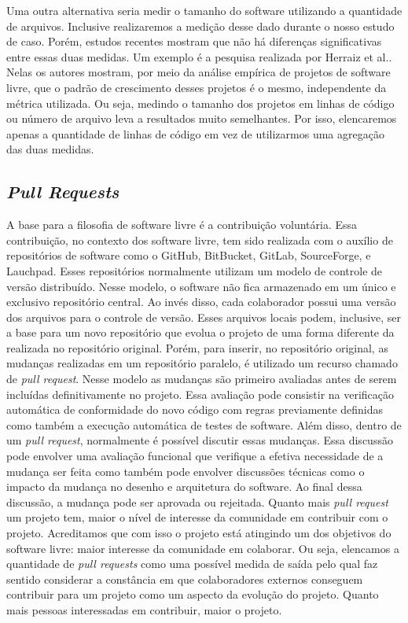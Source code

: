 Uma outra alternativa seria medir o tamanho do software utilizando a quantidade de arquivos. Inclusive realizaremos a medição desse dado durante o nosso estudo de caso. Porém, estudos recentes mostram que não há diferenças significativas entre essas duas medidas. Um exemplo é a pesquisa realizada por Herraiz et al.\cite{herraiz2006comparison}. Nelas os autores mostram, por meio da análise empírica de projetos de software livre, que o padrão de crescimento desses projetos é o mesmo, independente da métrica utilizada. Ou seja, medindo o tamanho dos projetos em linhas de código ou número de arquivo leva a resultados muito semelhantes. Por isso, elencaremos apenas a quantidade de linhas de código em vez de utilizarmos uma agregação das duas medidas.



\subsection{\textit{Pull Requests}}

A base para a filosofia de software livre é a contribuição voluntária. Essa contribuição, no contexto dos software livre, tem sido realizada com o auxílio de repositórios de software como o GitHub, BitBucket, GitLab, SourceForge, e Lauchpad. Esses repositórios normalmente utilizam um modelo de controle de versão distribuído. Nesse modelo, o software não fica armazenado em um único e exclusivo repositório central. Ao invés disso, cada colaborador possui uma versão dos arquivos para o controle de versão. Esses arquivos locais podem, inclusive, ser a base para um novo repositório que evolua o projeto de uma forma diferente da realizada no repositório original. Porém, para inserir, no repositório original, as mudanças realizadas em um repositório paralelo, é utilizado um recurso chamado de \textit{pull request}. Nesse modelo as mudanças são primeiro avaliadas antes de serem incluídas definitivamente no projeto. Essa avaliação pode consistir na verificação automática de conformidade do novo código com regras previamente definidas como também a execução automática de testes de software. Além disso, dentro de um \textit{pull request}, normalmente é possível discutir essas mudanças. Essa discussão pode envolver uma avaliação funcional que verifique a efetiva necessidade de a mudança ser feita como também pode envolver discussões técnicas como o impacto da mudança no desenho e arquitetura do software.  Ao final dessa discussão, a mudança pode ser aprovada ou rejeitada.  Quanto mais \textit{pull request} um projeto tem, maior o nível de interesse da comunidade em contribuir com o projeto. Acreditamos que com isso o projeto está atingindo um dos objetivos do software livre: maior interesse da comunidade em colaborar. Ou seja, elencamos a quantidade de \textit{pull requests} como uma possível medida de saída pelo qual faz sentido considerar a constância em que colaboradores externos conseguem contribuir para um projeto como um aspecto da evolução do projeto. Quanto mais pessoas interessadas em contribuir, maior o projeto.


